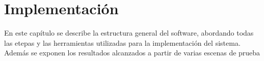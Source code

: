 \chapter{Implementación}

En este capítulo se describe la estructura general del software, abordando todas las etepas  y las herramientas utilizadas para la implementación del sistema. Además se exponen los resultados alcanzados a partir de varias escenas de prueba
